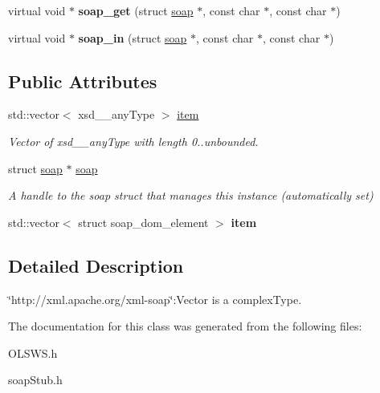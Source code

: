 \begin{DoxyCompactItemize}
\item 
\hypertarget{classns2____Vector_afb90f911a1d2535a62bb5b1a7b71cea0}{
virtual void $\ast$ {\bfseries soap\_\-get} (struct \hyperlink{classns2____Vector_ac6009a1d112437a258abd74b37db130f}{soap} $\ast$, const char $\ast$, const char $\ast$)}
\label{classns2____Vector_afb90f911a1d2535a62bb5b1a7b71cea0}

\item 
\hypertarget{classns2____Vector_ab5e55423efc014c774b92082e797c2c4}{
virtual void $\ast$ {\bfseries soap\_\-in} (struct \hyperlink{classns2____Vector_ac6009a1d112437a258abd74b37db130f}{soap} $\ast$, const char $\ast$, const char $\ast$)}
\label{classns2____Vector_ab5e55423efc014c774b92082e797c2c4}

\end{DoxyCompactItemize}
\subsection*{Public Attributes}
\begin{DoxyCompactItemize}
\item 
\hypertarget{classns2____Vector_a4eac84cf7300e6cfda40671104fcd49c}{
std::vector$<$ xsd\_\-\_\-anyType $>$ \hyperlink{classns2____Vector_a4eac84cf7300e6cfda40671104fcd49c}{item}}
\label{classns2____Vector_a4eac84cf7300e6cfda40671104fcd49c}

\begin{DoxyCompactList}\small\item\em Vector of xsd\_\-\_\-anyType with length 0..unbounded. \end{DoxyCompactList}\item 
\hypertarget{classns2____Vector_ac6009a1d112437a258abd74b37db130f}{
struct \hyperlink{classns2____Vector_ac6009a1d112437a258abd74b37db130f}{soap} $\ast$ \hyperlink{classns2____Vector_ac6009a1d112437a258abd74b37db130f}{soap}}
\label{classns2____Vector_ac6009a1d112437a258abd74b37db130f}

\begin{DoxyCompactList}\small\item\em A handle to the soap struct that manages this instance (automatically set) \end{DoxyCompactList}\item 
\hypertarget{classns2____Vector_a6d1f60f7b6575bed8593620effa6a692}{
std::vector$<$ struct soap\_\-dom\_\-element $>$ {\bfseries item}}
\label{classns2____Vector_a6d1f60f7b6575bed8593620effa6a692}

\end{DoxyCompactItemize}


\subsection{Detailed Description}
\char`\"{}http://xml.apache.org/xml-\/soap\char`\"{}:Vector is a complexType. 

The documentation for this class was generated from the following files:\begin{DoxyCompactItemize}
\item 
OLSWS.h\item 
soapStub.h\end{DoxyCompactItemize}
